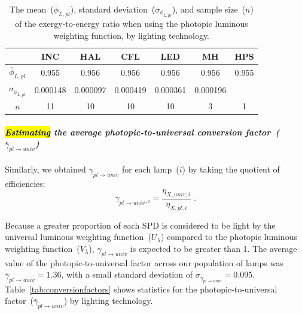 \documentclass[energies,article,accept,moreauthors,pdftex]{Definitions/mdpi}\usepackage[]{graphicx}\usepackage[]{color}
\newcommand{\gammarat}{\gamma_{pl\rightarrow{}univ}}
\newcommand{\gammaratavg}{\bar{\gamma}_{pl\rightarrow{}univ}}
\providecommand{\DIFaddend}{} %
\providecommand{\DIFaddendFL}{} %
\DeclareRobustCommand{\DIFaddend}{\DIFOaddend \let\includegraphics\DIFOincludegraphics} %
\DeclareRobustCommand{\DIFaddendFL}{\DIFOaddendFL \let\includegraphics\DIFOincludegraphics} %
\begin{document}
\begin{table}[H]
\centering
\caption{The mean~($\bar{\phi}_{L,pl}$),
                     standard deviation~($\sigma_{\phi_{L,pl}}$), and 
                     sample size~($n$)
                     of the exergy-to-energy ratio when using
                     the photopic luminous weighting function,
                     by lighting technology.} 
\label{tab:mean_phi_p2_by_lamp_type}
\begingroup\footnotesize
\begin{tabular}{ccccccc}
  \toprule
 & \textbf{INC} & \textbf{HAL} & \textbf{CFL} & \textbf{LED} & \textbf{MH} & \textbf{HPS} \\ 
  \midrule
\DIFaddendFL $\bar{\phi}_{L,pl}$  & 0.955 & 0.956 &0.956 & 0.956 & 0.956 & 0.955 \\ 
 $\sigma_{\phi_{L,pl}}$ & 0.000148 &0.000097 & 0.000419 & 0.000361 & 0.000196 &  \\ 
 $n$ & 11 & 10 & 10 & 10& 3& 1\\ 
   \bottomrule
\end{tabular}
\endgroup
\end{table}
\DIFaddend 



\paragraph{\emph{\hl{Estimating} the average photopic-to-universal conversion factor~($\gammaratavg{}$)}}

Similarly, we obtained $\gammarat{}$ for each lamp~($i$) by taking the quotient of efficiencies:
\begin{equation} \label{eq:conversionuniversal}
  \gammarat{}_{,i} = \frac{\eta_{X,univ,i}}{\eta_{X,pl,i}} \; .
\end{equation}

Because a greater proportion of each SPD is considered to be light
by the universal luminous weighting function~($U_\lambda$)
compared to the photopic luminous weighting function~($V_\lambda$), 
$\gammarat{}$ is expected to be greater than 1.
The average value of the photopic-to-universal factor across our population of lamps 
was $\gammaratavg{} = 1.36$,
with a small standard deviation of $\sigma_{\gammarat{}} = 0.095$. Table~\ref{tab:conversionfactors} shows 
statistics for the photopic-to-universal factor~($\gammaratavg{}$)
by lighting technology.
\end{document}
